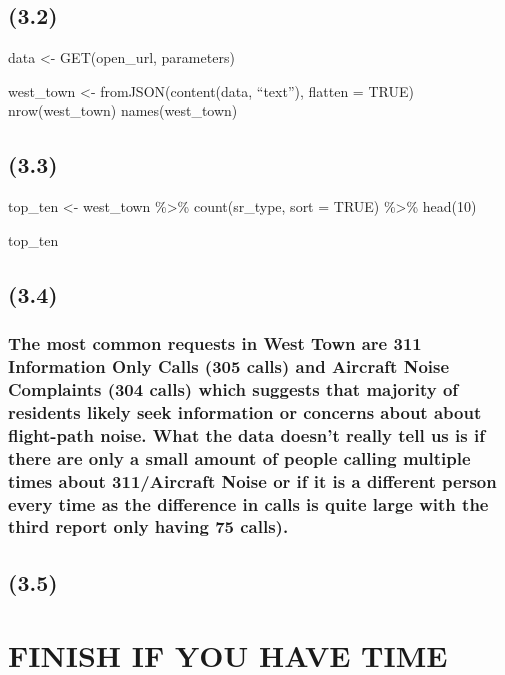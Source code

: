 \documentclass[
]{article}
\begin{document}
\subsection{(3.2)}\label{section-4}

data \textless- GET(open\_url, parameters)

west\_town \textless- fromJSON(content(data, ``text''), flatten = TRUE)
nrow(west\_town) names(west\_town)

\subsection{(3.3)}\label{section-5}

top\_ten \textless- west\_town \%\textgreater\% count(sr\_type, sort =
TRUE) \%\textgreater\% head(10)

top\_ten

\subsection{(3.4)}\label{section-6}

\subsubsection{The most common requests in West Town are 311 Information
Only Calls (305 calls) and Aircraft Noise Complaints (304 calls) which
suggests that majority of residents likely seek information or concerns
about about flight-path noise. What the data doesn't really tell us is
if there are only a small amount of people calling multiple times about
311/Aircraft Noise or if it is a different person every time as the
difference in calls is quite large with the third report only having 75
calls).}\label{the-most-common-requests-in-west-town-are-311-information-only-calls-305-calls-and-aircraft-noise-complaints-304-calls-which-suggests-that-majority-of-residents-likely-seek-information-or-concerns-about-about-flight-path-noise.-what-the-data-doesnt-really-tell-us-is-if-there-are-only-a-small-amount-of-people-calling-multiple-times-about-311aircraft-noise-or-if-it-is-a-different-person-every-time-as-the-difference-in-calls-is-quite-large-with-the-third-report-only-having-75-calls.}

\subsection{(3.5)}\label{section-7}

\section{FINISH IF YOU HAVE TIME}\label{finish-if-you-have-time}
\end{document}
